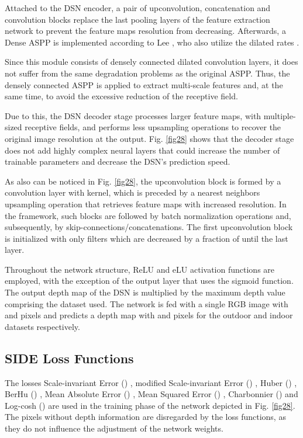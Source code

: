 \documentclass[5p]{elsarticle}
\begin{document}
Attached to the DSN encoder, a pair of upconvolution, concatenation and convolution blocks replace the last pooling layers of the feature extraction network to prevent the feature maps resolution from decreasing. Afterwards, a Dense ASPP \cite{yang2018denseaspp} is implemented according to Lee \etal \cite{lee2019big}, who also utilize the dilated rates .

Since this module consists of densely connected dilated convolution layers, it does not suffer from the same degradation problems as the original ASPP. Thus, the densely connected ASPP is applied to extract multi-scale features and, at the same time, to avoid the excessive reduction of the receptive field.

Due to this, the DSN decoder stage processes larger feature maps, with multiple-sized receptive fields, and performs less upsampling operations to recover the original image resolution  at the output. Fig. \ref{fig28} shows that the decoder stage does not add highly complex neural layers that could increase the number of trainable parameters and decrease the DSN's prediction speed.

As also can be noticed in Fig. \ref{fig28}, the upconvolution block is formed by a convolution layer with  kernel, which is preceded by a nearest neighbors upsampling operation that retrieves feature maps with  increased resolution. In the framework, such blocks are followed by batch normalization operations and, subsequently, by skip-connections/concatenations. The first upconvolution block is initialized with only  filters which are decreased by a fraction of  until the last layer. 

Throughout the network structure, ReLU \cite{agarap2018deep} and eLU \cite{clevert2015fast} activation functions are employed, with the exception of the output layer that uses the sigmoid function. The output depth map of the DSN is multiplied by the maximum depth value comprising the dataset used. The network is fed with a single RGB image with  and  pixels and predicts a depth map with  and  pixels for the outdoor \cite{uhrig2017sparsity,cordts2016cityscapes} and indoor \cite{silberman2012indoor,song2015sun,janoch2013category,xiao2013sun3d} datasets respectively. 

\subsection{SIDE Loss Functions}
\label{fdc}

The losses Scale-invariant Error () \cite{eigen2014depth}, modified Scale-invariant Error () \cite{lee2019big}, Huber () \cite{carvalho2018regression}, BerHu () \cite{zwald2012berhu}, Mean Absolute Error () \cite{godard2017unsupervised}, Mean Squared Error () \cite{fu2018deep}, Charbonnier () \cite{sun2014quantitative} and Log-cosh () \cite{chen2018log} are used in the training phase of the network depicted in Fig. \ref{fig28}. The pixels without depth information are disregarded by the loss functions, as they do not influence the adjustment of the network weights.
\end{document}
